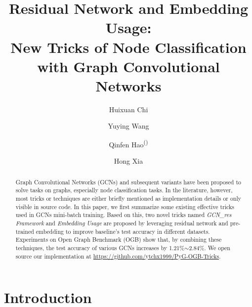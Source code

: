 \documentclass[runningheads]{llncs}
\begin{document}
\title{Residual Network and Embedding Usage:\\ New Tricks of Node Classification with Graph Convolutional Networks}
\author{Huixuan Chi \and Yuying Wang \and
Qinfen Hao\textsuperscript{(\Letter)} \and Hong Xia}






\maketitle              



\begin{abstract}

Graph Convolutional Networks (GCNs) and subsequent
variants have been proposed to solve tasks on graphs, especially node
classification tasks. In the literature, however, most tricks or
techniques are either briefly mentioned as implementation details or
only visible in source code. In this paper, we first summarize some
existing effective tricks used in GCNs mini-batch training. Based on
this, two novel tricks named \textsl{GCN\_res Framework} and \textsl{Embedding
Usage} are proposed by leveraging residual network and pre-trained embedding to improve baseline's test accuracy in
different datasets. Experiments on Open Graph Benchmark (OGB) show that,
by combining these techniques, the test accuracy of various GCNs increases by 1.21\%$\sim$2.84\%. 
We open source our implementation at
 \url{https://github.com/ytchx1999/PyG-OGB-Tricks}.

\end{abstract}
\section{Introduction}\label{introduction}
\end{document}
